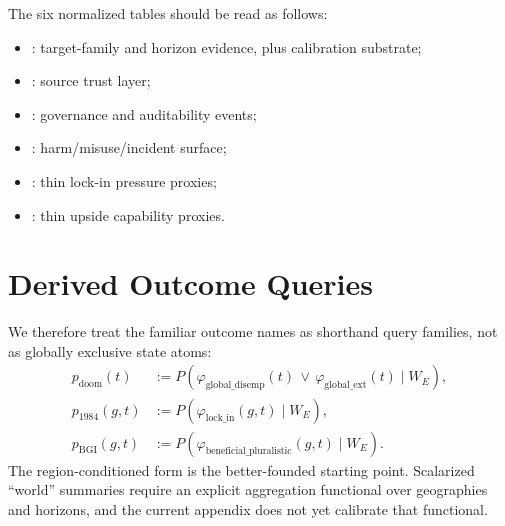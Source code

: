 \documentclass[11pt,openany]{report}
\begin{document}
\begin{table}[htbp]
\centering
\caption{Factor families directly supported by the current normalized
advanced-AI appendix bundle.}
\label{tab:ai-outcomes-factor-support}
\end{table}

The six normalized tables should be read as follows:
\begin{itemize}
\item {}: target-family and horizon evidence,
  plus calibration substrate;
\item {}: source trust layer;
\item {}: governance and
  auditability events;
\item {}: harm/misuse/incident surface;
\item {}: thin lock-in pressure proxies;
\item {}: thin upside capability proxies.
\end{itemize}

\section{Derived Outcome Queries}

We therefore treat the familiar outcome names as shorthand query
families, not as globally exclusive state atoms:
\begin{align*}
  p_{\mathrm{doom}}(t) &:= P(\varphi_{\mathrm{global\_disemp}}(t)
    \,\lor\, \varphi_{\mathrm{global\_ext}}(t) \mid W_E),\\
  p_{1984}(g,t) &:= P(\varphi_{\mathrm{lock\_in}}(g,t) \mid W_E),\\
  p_{\mathrm{BGI}}(g,t) &:= P(\varphi_{\mathrm{beneficial\_pluralistic}}(g,t)
    \mid W_E).
\end{align*}
The region-conditioned form is the better-founded starting point.
Scalarized ``world'' summaries require an explicit aggregation functional
over geographies and horizons, and the current appendix does not yet
calibrate that functional.
\end{document}
